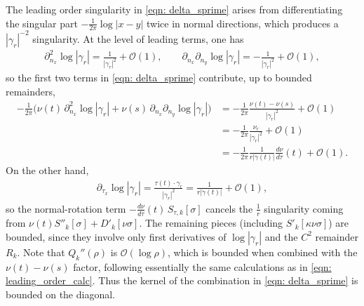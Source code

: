 \documentclass{amsart}
\theoremstyle{plain}
\begin{document}
The leading order singularity in \eqref{eqn: delta_sprime} arises from
differentiating the singular part $-\frac{1}{2\pi}\log|x-y|$ twice in normal directions,
which produces a $|\gamma_r|^{-2}$ singularity. At the level of leading terms, one has
\begin{align}
  \partial_{n_x}^2\log|\gamma_r| = \frac{1}{|\gamma_r|^2}+\mathcal{O}(1),\qquad
  \partial_{n_x}\partial_{n_y}\log|\gamma_r| = -\frac{1}{|\gamma_r|^2}+\mathcal{O}(1),
\end{align}
so the first two terms in \eqref{eqn: delta_sprime} contribute, up to bounded remainders,
\begin{equation}
\begin{aligned}\label{eqn: leading_order_calc}
  -\frac{1}{2\pi}\Big(\nu(t)\,\partial_{n_x}^2\log|\gamma_r|
  +\nu(s)\,\partial_{n_x}\partial_{n_y}\log|\gamma_r|\Big)
  &= -\frac{1}{2\pi}\frac{\nu(t)-\nu(s)}{|\gamma_r|^2} + \mathcal{O}(1) \\
  &= -\frac{1}{2\pi}\frac{\nu_r}{|\gamma_r|^2} + \mathcal{O}(1) \\
  &= -\frac{1}{2\pi}\frac{1}{r|\dot\gamma(t)|}\frac{d\nu}{d\tau}(t)
     + \mathcal{O}(1).
\end{aligned}
\end{equation}
On the other hand,
\begin{align}
  \partial_{\tau_x}\log|\gamma_r|
  = \frac{\tau(t)\cdot\gamma_r}{|\gamma_r|^2}
  = \frac{1}{r|\dot\gamma(t)|}+\mathcal{O}(1),
\end{align}
so the normal-rotation term $-\frac{d\nu}{d\tau}(t)\,S_{\tau,k}[\sigma]$
cancels the $\frac{1}{r}$ singularity coming from $\nu(t)S''_k[\sigma]+D'_k[\nu\sigma]$.
The remaining pieces (including $S'_k[\kappa\nu\sigma]$) are bounded, since they involve
only first derivatives of $\log|\gamma_r|$ and the $C^2$ remainder $R_k$. 
Note that $Q_k''(\rho)$ is $\mathcal{O}(\log\rho)$, which is bounded when combined with the $\nu(t)-\nu(s)$ factor, following essentially the same calculations as in \eqref{eqn: leading_order_calc}. 
Thus the kernel
of the combination in \eqref{eqn: delta_sprime} is bounded on the diagonal.
\end{document}
